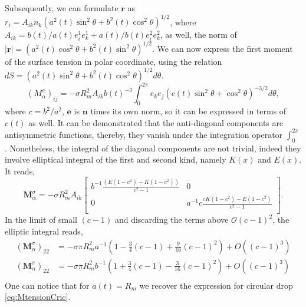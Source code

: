 Subsequently, we can formulate $\bm{r}$ as 
$r_i = A_{ik} n_k (a^2(t)\sin^2\theta+b^2(t)\cos^2\theta)^{1/2}$, 
where $A_{ik} =b(t)/a(t) e^1_ie^1_k+a(t)/b(t)e^2_ie^2_k$,
as well, the norm of $|\bm{r}| = (a^2(t)\cos^2\theta+b^2(t)\sin^2\theta)^{1/2}$.
We can now express the first moment of the surface tension in polar coordinate, using the relation 
$dS = (a^2(t)\sin^2\theta+b^2(t)\cos^2\theta)^{1/2}d\theta$.
\begin{equation*}
    (M_{\alpha}^\sigma)_{ij} 
    = - \sigma R_m^2 A_{ik} b(t)^{-3}\int_{0}^{2\pi}
    e_k  e_j 
    (c(t)\sin^2\theta+\cos^2\theta)^{-3/2} 
    d\theta,
\end{equation*}
where $c = b^2/a^2$, $\bm{e}$ is $\bm{n}$ times its own norm, so it can be expressed in terms of $c(t) $ as well. 
It can be demonstrated that the anti-diagonal components are antisymmetric functions, thereby, they vanish under the integration operator $\int_0^{2\pi}$. 
Nonetheless, the integral of the diagonal components are not trivial, indeed they involve elliptical integral of the first and second kind, namely $K(x)$ and $E(x)$. It reads,
\begin{equation*}
    \bm{M}_{\alpha}^\sigma
    = - \sigma R_m^2 A_{ik} \left[    
        \begin{matrix}
            b^{-1} \frac{(E(1 - c^2) - K(1 - c^2))}{c^2-1} & 0\\
            0 & a^{-1} c\frac{cK(1 - c^2) - E(1 - c^2)}{c^2-1}\\
        \end{matrix}
    \right].
\end{equation*}
In the limit of small $(c-1)$ and discarding the terms above $\mathcal{O}(c-1)^2$, the elliptic integral reads,
\begin{align*}
    (\bm{M}_{\alpha}^\sigma)_{22}
    &= - \sigma \pi R_m^2 
            a^{-1} (1 -\frac{3}{4}   (c-1)+\frac{9}{16}   (c-1)^2 )
    +O\left((c-1)^3\right)\\
    (\bm{M}_{\alpha}^\sigma)_{22}
    &= - \sigma \pi R_m^2 
            b^{-1} (1 +\frac{3}{4}   (c-1)-\frac{3}{16}   (c-1)^2)
    +O\left((c-1)^3\right)\\
    \label{eq:momentSigma}
\end{align*}
One can notice that for $a(t) = R_m$ we recover the expression for circular drop \ref{eq:MtensionCric}.

